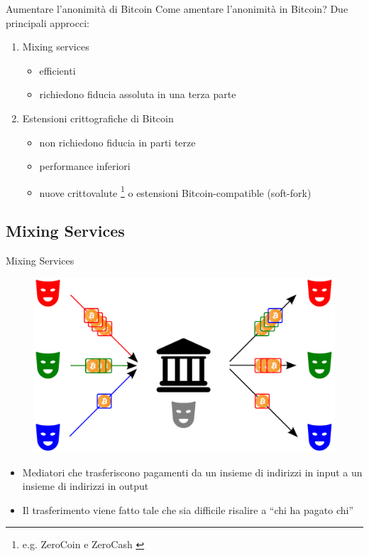 \documentclass{beamer}
\begin{document}
  
  
  
  \begin{frame}{Aumentare l'anonimità di Bitcoin}
      Come amentare l'anonimità in Bitcoin? Due principali approcci:
      \begin{enumerate}
          \item Mixing services
          \begin{itemize}
              \item[\MVRightarrow] efficienti
              \item[\MVRightarrow] richiedono fiducia assoluta in una terza parte
          \end{itemize}
          \item Estensioni crittografiche di Bitcoin
          \begin{itemize}
              \item[\MVRightarrow] non richiedono fiducia in parti terze
              \item[\MVRightarrow] performance inferiori
              \item[\MVRightarrow] nuove crittovalute \footnote{e.g. ZeroCoin \cite{miers2013zerocoin} e ZeroCash \cite{sasson2014zerocash}} o estensioni Bitcoin-compatible (soft-fork)
          \end{itemize}
      \end{enumerate}
  \end{frame}
  
  
  \subsection{Mixing Services}
  \begin{frame}{Mixing Services}
      \begin{figure}
          \centering
          \includegraphics[width=0.6\linewidth]{../img/mixing-service-scheme.png}
      \end{figure}
      \begin{itemize}
          \item Mediatori che trasferiscono pagamenti da un insieme di indirizzi in input a un insieme di indirizzi in output
          \item Il trasferimento viene fatto tale che sia difficile risalire a ``chi ha pagato chi''
      \end{itemize}
  \end{frame}
  
\end{document}
